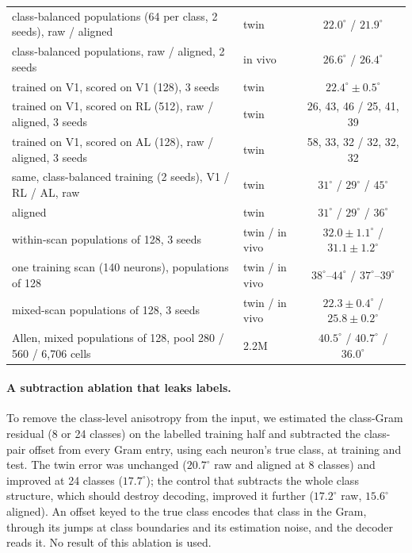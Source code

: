 \documentclass[11pt]{article}
\begin{document}
\begin{table}[htbp]
\begin{tabular}{llc}
    class-balanced populations (64 per class, 2 seeds), raw / aligned & twin & $22.0^\circ$ / $21.9^\circ$ \\
    class-balanced populations, raw / aligned, 2 seeds & in vivo & $26.6^\circ$ / $26.4^\circ$ \\
    trained on V1, scored on V1 (128), 3 seeds & twin & $22.4^\circ \pm 0.5^\circ$ \\
    trained on V1, scored on RL (512), raw / aligned, 3 seeds & twin & 26, 43, 46 / 25, 41, 39 \\
    trained on V1, scored on AL (128), raw / aligned, 3 seeds & twin & 58, 33, 32 / 32, 32, 32 \\
    same, class-balanced training (2 seeds), V1 / RL / AL, raw & twin & $31^\circ$ / $29^\circ$ / $45^\circ$ \\
    \quad aligned & twin & $31^\circ$ / $29^\circ$ / $36^\circ$ \\
    within-scan populations of 128, 3 seeds & twin / in vivo & $32.0 \pm 1.1^\circ$ / $31.1 \pm 1.2^\circ$ \\
    one training scan (140 neurons), populations of 128 & twin / in vivo & $38^\circ$--$44^\circ$ / $37^\circ$--$39^\circ$ \\
    mixed-scan populations of 128, 3 seeds & twin / in vivo & $22.3 \pm 0.4^\circ$ / $25.8 \pm 0.2^\circ$ \\
    \midrule
    Allen, mixed populations of 128, pool 280 / 560 / 6,706 cells & 2.2M & $40.5^\circ$ / $40.7^\circ$ / $36.0^\circ$ \\
    \bottomrule
  \end{tabular}
\end{table}

\paragraph{A subtraction ablation that leaks labels.} To remove the class-level anisotropy from the input, we estimated the class-Gram residual (8 or 24 classes) on the labelled training half and subtracted the class-pair offset from every Gram entry, using each neuron's true class, at training and test. The twin error was unchanged ($20.7^\circ$ raw and aligned at 8 classes) and improved at 24 classes ($17.7^\circ$); the control that subtracts the whole class structure, which should destroy decoding, improved it further ($17.2^\circ$ raw, $15.6^\circ$ aligned). An offset keyed to the true class encodes that class in the Gram, through its jumps at class boundaries and its estimation noise, and the decoder reads it. No result of this ablation is used.
\end{document}
